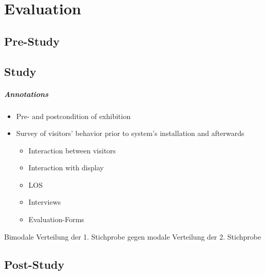 \chapter{Evaluation}
\label{evaluation}


\section{Pre-Study}
\label{evaluation_pre}


\section{Study}
\label{evaluation_study}

\paragraph{Annotations}

\begin{itemize}
	\item Pre- and postcondition of exhibition
	\item Survey of visitors' behavior prior to system's installation and afterwards
	\begin{itemize}
		\item Interaction between visitors
		\item Interaction with display
		\item \ac{LOS}
		\item Interviews
		\item Evaluation-Forms
	\end{itemize}
\end{itemize}

Bimodale Verteilung der 1. Stichprobe gegen modale Verteilung der 2. Stichprobe


\section{Post-Study}
\label{evaluation_post}
